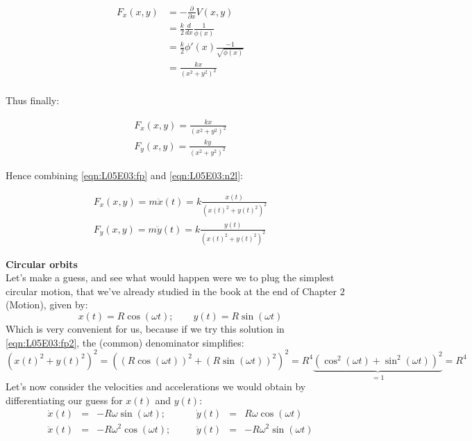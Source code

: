 \documentclass[solutions.tex]{subfiles}
\begin{document}
\begin{equation}
	\begin{aligned}
		F_x(x, y) &= -\frac{\partial}{\partial x}V(x, y) \\
		~ &= \frac{k}2\frac{d}{dx}\frac1{\phi(x)} \\
		~ &= \frac{k}2\phi'(x)\frac{-1}{\sqrt{\phi(x)}} \\
		~ &= \frac{kx}{(x^2+y^2)^2} \\
	\end{aligned}
\end{equation}

Thus finally:

\begin{equation}
	\label{eqn:L05E03:fp}
	\begin{aligned}
		F_x(x, y) = \frac{kx}{(x^2+y^2)^2} \\
		F_y(x, y) = \frac{ky}{(x^2+y^2)^2}
	\end{aligned}
\end{equation}

Hence combining \eqref{eqn:L05E03:fp} and \eqref{eqn:L05E03:n2l}:

\begin{equation}
	\label{eqn:L05E03:fp2}
	\begin{aligned}
		F_x(x, y) = \boxed{m\ddot{x}(t) = k\frac{x(t)}{(x(t)^2+y(t)^2)^2}} \\
		F_y(x, y) = \boxed{m\ddot{y}(t) = k\frac{y(t)}{(x(t)^2+y(t)^2)^2}}
	\end{aligned}
\end{equation}

\hr
\textbf{Circular orbits}\ \\

Let's make a guess, and see what would happen were we to plug the simplest
circular motion, that we've already studied in the book at the end of
Chapter $2$ (Motion), given by:
\[
	x(t) = R\cos(\omega t);\quad\quad y(t) = R\sin(\omega t)
\]
Which is very convenient for us, because if we try this solution in
\eqref{eqn:L05E03:fp2}, the (common) denominator simplifies:
\[
	\left(x(t)^2+y(t)^2\right)^2 = \left((R\cos(\omega t))^2+(R\sin(\omega t))^2\right)^2
		= R^4\underbrace{(\cos^2(\omega t)+\sin^2(\omega t))^2}_{=1} = R^4
\]
Let's now consider the velocities and accelerations we would obtain by
differentiating our guess for $x(t)$ and $y(t)$:
\begin{equation*} \begin{aligned}
	\dot{x}(t) &=& -R\omega\sin(\omega t);&\quad& \dot{y}(t) &=& R\omega\cos(\omega t) \\
	\ddot{x}(t) &=& -R\omega^2\cos(\omega t);&\quad& \ddot{y}(t) &=& -R\omega^2\sin(\omega t)
\end{aligned} \end{equation*}
\end{document}
